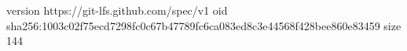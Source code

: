 version https://git-lfs.github.com/spec/v1
oid sha256:1003c02f75ecd7298fc0c67b47789fc6ca083ed8c3e44568f428bee860e83459
size 144
